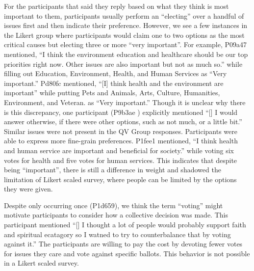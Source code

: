 For the participants that said they reply based on what they think is most important to them, 
participants usually perform an ``electing'' over a handful of issues first and then indicate their preference.
However, we see a few instances in the Likert group where participants would claim one to two options as the most critical causes but electing three or more ``very important''.
For example, P09a47 mentioned, ``I think the environment education and healthcare should be our top priorities right now. Other issues are also important but not as much so.''
while filling out Education, Environment, Health, and Human Services as ``Very important.'' 
Pd80fc mentioned, ``[I] think health and the environment are important'' while putting Pets and Animals, Arts, Culture, Humanities, Environment, and Veteran. as ``Very important.'' 
Though it is unclear why there is this discrepancy, one participant (P9b3ae
) explicitly mentioned ``[\textellipsis] I would answer otherwise, if there were other options, such as not much, or a little bit.''
Similar issues were not present in the QV Group responses.
Participants were able to express more fine-grain preferences.
P1fee1 mentioned, ``I think health and human service are important and beneficial for society.'' while voting six votes for health and five votes for human services. This indicates that despite being ``important'', there is still a difference in weight and shadowed the limitation of Likert scaled survey, where people can be limited by the options they were given.\par

Despite only occurring once (P1d659), we think the term ``voting'' might motivate participants to consider how a collective decision was made.
This participant mentioned ``[\textellipsis] I thought a lot of people would probably support faith and spiritual ecatagory  so I watned to try to counterbalance that by voting against it.'' The participants are willing to pay the cost by devoting fewer votes for issues they care and vote against specific ballots. This behavior is not possible in a Likert scaled survey.\par

